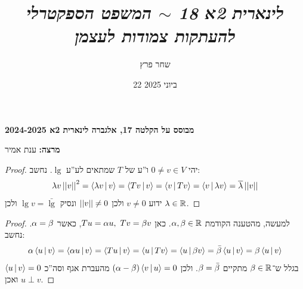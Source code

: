 \documentclass[]{../../../../tex/classes/styledArticle}
\author{שחר פרץ}
\title{\textit{לינארית 2א 18 $\sim$ המשפט הספקטרלי להעתקות צמודות לעצמן}}
\date{22 ביוני 2025}
\begin{document}
	\maketitle
	\textbf{מבוסס על הקלטה 17, אלגברה לינארית 2א 2024-2025}
	
	\textbf{מרצה: }ענת אמיר
	
	\begin{proof}
		יהי $0 \neq v \in V$ ו''ע של $T$ שמתאים לע''ע $\lg$. נחשב: 
		\[ \lg v\norm{v}^2 = \mut{\lg v}{v} = \mut{T v}{v} = \mut{v}{Tv} = \mut{v}{\lg v} = \ol \lg \norm{v} \]
		ידוע $v \neq 0$ ולכן $\norm{v} \neq 0$ ונסיק $\lg v = \bar \lg $ ולכן $\lg \in \R$. 
	\end{proof}
	
	\begin{proof}
		למעשה, מהטענה הקודמת $\ag, \bg \in \R$. כאן $Tu = \ag u, \ Tv = \bg v$, כאשר $\ag = \bg$. נחשב: 
		\[ \ag \mut{u}{v} = \mut{\ag u}{v} = \mut{Tu}{v} = \mut{u}{Tv} = \mut{u}{\bg v} = \bar \bg \mut{u}{v} = \bg \mut{u}{v} \]
		בגלל ש־$\bg \in \R$ מתקיים $\bg = \bar \bg$. ולכן $(\ag - \bg)\mut{v}{u} = 0$ מהעברת אגף וסה''כ $\mut{u}{v} = 0$ ואכן $u \perp v$. 
	\end{proof}
	
\end{document}
